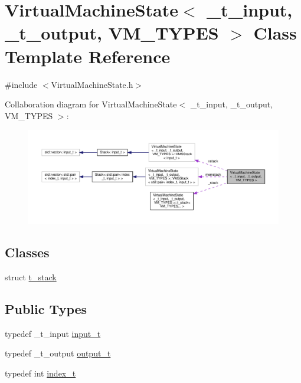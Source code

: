 \hypertarget{class_virtual_machine_state}{}\section{Virtual\+Machine\+State$<$ \+\_\+t\+\_\+input, \+\_\+t\+\_\+output, V\+M\+\_\+\+T\+Y\+P\+ES $>$ Class Template Reference}
\label{class_virtual_machine_state}


{\ttfamily \#include $<$Virtual\+Machine\+State.\+h$>$}



Collaboration diagram for Virtual\+Machine\+State$<$ \+\_\+t\+\_\+input, \+\_\+t\+\_\+output, V\+M\+\_\+\+T\+Y\+P\+ES $>$\+:\nopagebreak
\begin{figure}[H]
\begin{center}
\leavevmode
\includegraphics[width=350pt]{class_virtual_machine_state__coll__graph}
\end{center}
\end{figure}
\subsection*{Classes}
\begin{DoxyCompactItemize}
\item 
struct \hyperlink{struct_virtual_machine_state_1_1t__stack}{t\+\_\+stack}
\end{DoxyCompactItemize}
\subsection*{Public Types}
\begin{DoxyCompactItemize}
\item 
typedef \+\_\+t\+\_\+input \hyperlink{class_virtual_machine_state_a04c5592dddd5b9ffdae5a509d73127dd}{input\+\_\+t}
\item 
typedef \+\_\+t\+\_\+output \hyperlink{class_virtual_machine_state_a005a025f97d9505b00e7f9f0e99002bb}{output\+\_\+t}
\item 
typedef int \hyperlink{class_virtual_machine_state_a95ba2f54f65b778c8a012ea3e7a0ee50}{index\+\_\+t}
\end{DoxyCompactItemize}
